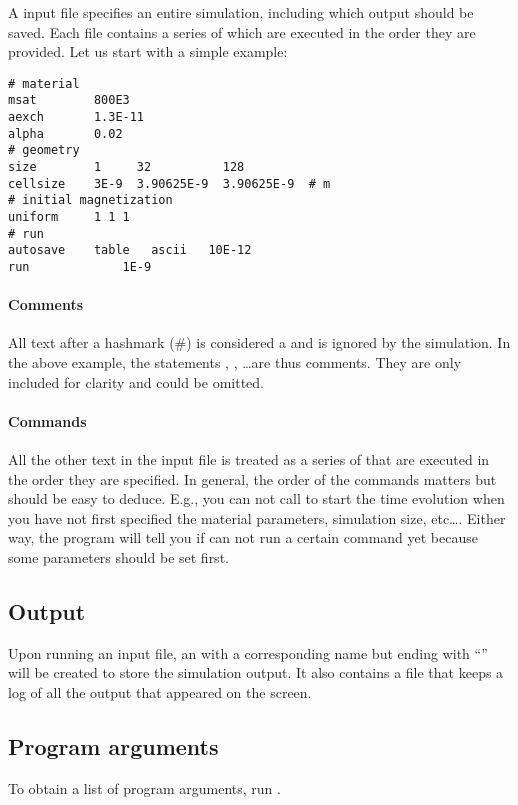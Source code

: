 A \prog input file specifies an entire simulation, including which output should be saved. Each file contains a series of  which are executed in the order they are provided. Let us start with a simple example:


\begin{verbatim}
# material
msat       	800E3 
aexch      	1.3E-11
alpha      	0.02
# geometry 
size       	1     32          128    
cellsize   	3E-9  3.90625E-9  3.90625E-9  # m
# initial magnetization
uniform		1 1 1
# run
autosave	table	ascii	10E-12
run          	1E-9
\end{verbatim}

\paragraph{Comments} All text after a hashmark (\#) is considered a  and is ignored by the simulation. In the above example, the statements , , \ldots are thus comments. They are only included for clarity and could be omitted.

\paragraph{Commands} All the other text in the input file is treated as a series of  that are executed in the order they are specified. In general, the order of the commands matters but should be easy to deduce.  E.g., you can not call  to start the time evolution when you have not first specified the material parameters, simulation size, etc\ldots. Either way, the program will tell you if can not run a certain command yet because some parameters should be set first.



\subsection{Output}


Upon running an input file, an  with a corresponding name but ending with ``'' will be created to store the simulation output. It also contains a file  that keeps a log of all the output that appeared on the screen.  


\subsection{Program arguments}\label{arguments}

To obtain a list of program arguments, run \prog {}.
